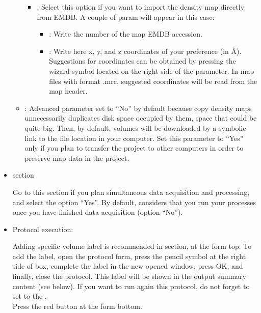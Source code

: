 \begin{itemize}
\begin{itemize}
\begin{itemize}
                    \item {}: Select this option if you want to import the density map directly from EMDB. A couple of param will appear in this case:\\
                                \begin{itemize}
                                \item {}: Write the number of the map EMDB accession.
                                \item {}: Write here x, y, and z coordinates of your preference (in \AA). Suggestions for coordinates can be obtained by pressing the wizard symbol located on the right side of the  parameter. In map files with format .mrc, suggested coordinates will be read from the map header.
                                \end{itemize}
                    \end{itemize}
        \item {}: Advanced parameter set to ``No'' by default because copy density maps unnecessarily duplicates disk space occupied by them, space that could be quite big. Then, by default, volumes will be downloaded by a symbolic link to the file location in your computer. Set this parameter to ``Yes'' only if you plan to transfer the project to other computers in order to preserve map data in the \scipion project.
        \end{itemize}
   
  \item {} section
  
  Go to this section if you plan simultaneous data acquisition and processing, and select the option ``Yes''. By default, \scipion considers that you run your processes once you have finished data acquisition (option ``No'').
  

  \item Protocol execution:
  
  Adding specific volume label is recommended in  section, at the form top. To add the label, open the protocol form, press the pencil symbol at the right side of  box, complete the label in the new opened window, press OK, and finally, close the protocol. This label will be shown in the output summary content (see below). If you want to run again this protocol, do not forget to set to  the .\\
  Press the  red button at the form bottom.
  

\end{itemize}
